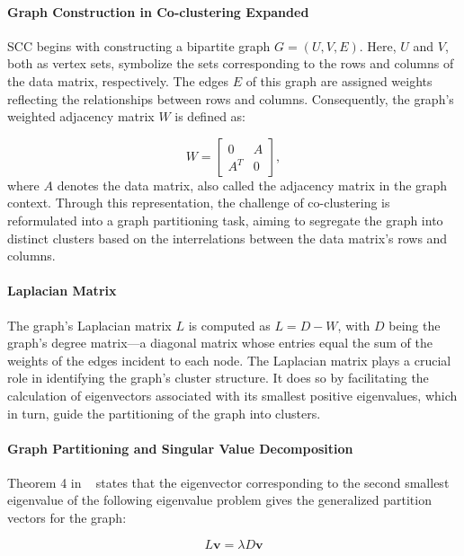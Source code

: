 \documentclass[journal]{IEEEtran}
\renewcommand{\cite}[1]{~\autocite{#1}}
\begin{document}
\paragraph{Graph Construction in Co-clustering Expanded}

SCC begins with constructing a bipartite graph $G=(U,V,E)$. Here, $U$ and $V$, both as vertex sets, symbolize the sets corresponding to the rows and columns of the data matrix, respectively. The edges $E$ of this graph are assigned weights reflecting the relationships between rows and columns. Consequently, the graph's weighted adjacency matrix $W$ is defined as:

$$ W = \begin{bmatrix} 0 & A \\ A^T & 0 \end{bmatrix}, $$
where $A$ denotes the data matrix, also called the adjacency matrix in the graph context.
Through this representation, the challenge of co-clustering is reformulated into a graph partitioning task, aiming to segregate the graph into distinct clusters based on the interrelations between the data matrix's rows and columns.

\paragraph{Laplacian Matrix}

The graph's Laplacian matrix $L$ is computed as $L=D-W$, with $D$ being the graph's degree matrix—a diagonal matrix whose entries equal the sum of the weights of the edges incident to each node. The Laplacian matrix plays a crucial role in identifying the graph's cluster structure. It does so by facilitating the calculation of eigenvectors associated with its smallest positive eigenvalues, which in turn, guide the partitioning of the graph into clusters.

\paragraph{Graph Partitioning and Singular Value Decomposition}

Theorem 4 in \cite{dhillon2001CoclusteringDocumentsWords} states that the eigenvector corresponding to the second smallest eigenvalue of the following eigenvalue problem gives the generalized partition vectors for the graph:

\begin{equation}
  L \mathbf{v} = \lambda D \mathbf{v}
  \label{eq:eigenvalue_problem}
\end{equation}
\end{document}
